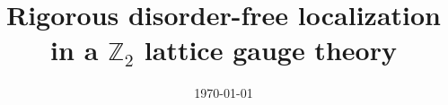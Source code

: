 \documentclass[11pt]{article}
\title{Rigorous disorder-free localization in a $\mathbb{Z}_2$ lattice gauge theory}
\author{}
\date{\today}
\theoremstyle{plain}
\theoremstyle{definition}
\theoremstyle{remark}
\begin{document}
\maketitle


\tableofcontents











\appendix
\begingroup
\raggedright

\par
\endgroup



\end{document}
